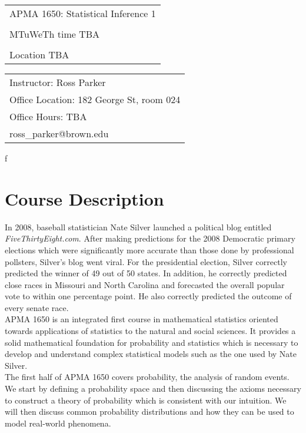 \documentclass[11pt]{article}
\begin{document}
\begin{tabular}{ l }
 \LARGE APMA 1650: Statistical Inference 1 \\\\
 \LARGE MTuWeTh time TBA \\\\
 \LARGE Location TBA
\end{tabular}
\vspace{5mm}

\begin{tabular}{ l }
   \large Instructor: Ross Parker \\
   \large Office Location: 182 George St, room 024 \\
   \large Office Hours: TBA \\
   \large ross\_parker@brown.edu \\
\end{tabular}
f
\section*{Course Description}
In 2008, baseball statistician Nate Silver launched a political blog entitled \emph{FiveThirtyEight.com}. After making predictions for the 2008 Democratic primary elections which were significantly more accurate than those done by professional pollsters, Silver's blog went viral. For the presidential election, Silver correctly predicted the winner of 49 out of 50 states. In addition, he correctly predicted close races in Missouri and North Carolina and forecasted the overall popular vote to within one percentage point. He also correctly predicted the outcome of every senate race.\\

APMA 1650 is an integrated first course in mathematical statistics oriented towards applications of statistics to the natural and social sciences. It provides a solid mathematical foundation for probability and statistics which is necessary to develop and understand complex statistical models such as the one used by Nate Silver.\\

The first half of APMA 1650 covers probability, the analysis of random events. We start by defining a probability space and then discussing the axioms necessary to construct a theory of probability which is consistent with our intuition. We will then discuss common probability distributions and how they can be used to model real-world phenomena.\\
\end{document}
